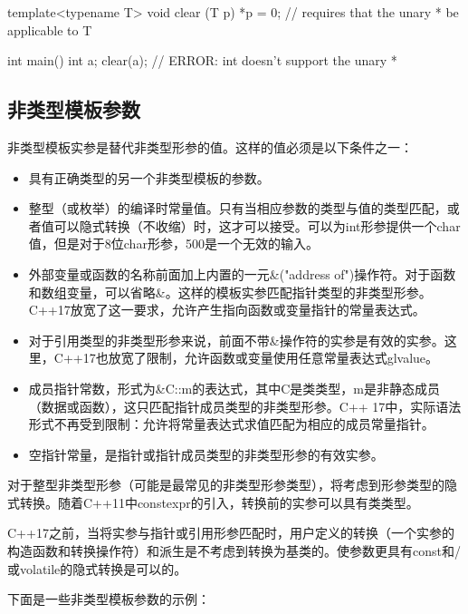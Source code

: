 \begin{cpp}
template<typename T>
void clear (T p) {
	*p = 0; // requires that the unary * be applicable to T
}

int main() {
	int a;
	clear(a); // ERROR: int doesn't support the unary *
}
\end{cpp}

\subsection{非类型模板参数}

非类型模板实参是替代非类型形参的值。这样的值必须是以下条件之一：

\begin{itemize}
\item 
具有正确类型的另一个非类型模板的参数。

\item
整型（或枚举）的编译时常量值。只有当相应参数的类型与值的类型匹配，或者值可以隐式转换（不收缩）时，这才可以接受。可以为int形参提供一个char值，但是对于8位char形参，500是一个无效的输入。

\item 
外部变量或函数的名称前面加上内置的一元\&("address of")操作符。对于函数和数组变量，可以省略\&。这样的模板实参匹配指针类型的非类型形参。C++17放宽了这一要求，允许产生指向函数或变量指针的常量表达式。

\item 
对于引用类型的非类型形参来说，前面不带\&操作符的实参是有效的实参。这里，C++17也放宽了限制，允许函数或变量使用任意常量表达式glvalue。

\item 
成员指针常数，形式为\&C::m的表达式，其中C是类类型，m是非静态成员（数据或函数），这只匹配指针成员类型的非类型形参。C++ 17中，实际语法形式不再受到限制：允许将常量表达式求值匹配为相应的成员常量指针。

\item 
空指针常量，是指针或指针成员类型的非类型形参的有效实参。
\end{itemize}

对于整型非类型形参（可能是最常见的非类型形参类型），将考虑到形参类型的隐式转换。随着C++11中constexpr的引入，转换前的实参可以具有类类型。

C++17之前，当将实参与指针或引用形参匹配时，用户定义的转换（一个实参的构造函数和转换操作符）和派生是不考虑到转换为基类的。使参数更具有const和/或volatile的隐式转换是可以的。

下面是一些非类型模板参数的示例：

